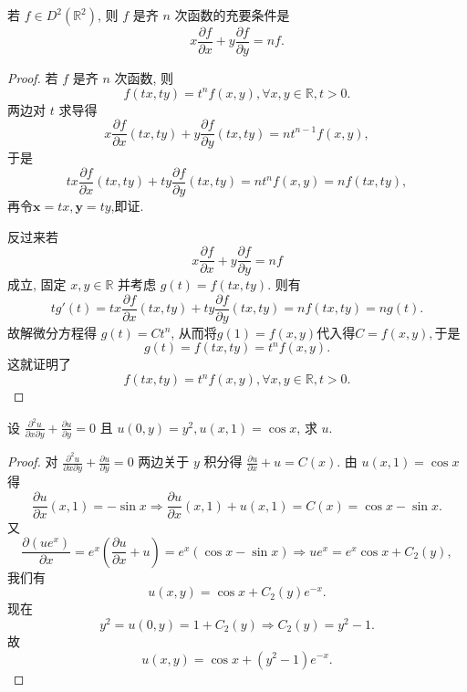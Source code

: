 \documentclass[../../main.tex]{subfiles}%
\begin{document}
\begin{proposition}[齐次函数基本性质]\label{proposition:齐次函数基本性质}
若 \( f \in D^2(\mathbb{R}^2) \), 则 \( f \) 是齐 \( n \) 次函数的充要条件是
\[
x \frac{\partial f}{\partial x} + y \frac{\partial f}{\partial y} = n f.
\]
\end{proposition}
\begin{proof}
若 \( f \) 是齐 \( n \) 次函数, 则
\[
f(tx, ty) = t^n f(x, y), \forall x, y \in \mathbb{R}, t > 0.
\]
两边对 \( t \) 求导得
\[
x \frac{\partial f}{\partial x}(tx, ty) + y \frac{\partial f}{\partial y}(tx, ty) = n t^{n - 1} f(x, y),
\]
于是
\[
tx \frac{\partial f}{\partial x}(tx, ty) + ty \frac{\partial f}{\partial y}(tx, ty) = n t^n f(x, y) = n f(tx, ty),
\]
再令$\mathbf{x}=tx,\mathbf{y}=ty$,即证.

反过来若
\[
x \frac{\partial f}{\partial x} + y \frac{\partial f}{\partial y} = n f
\]
成立, 固定 \( x, y \in \mathbb{R} \) 并考虑 \( g(t) = f(tx, ty) \). 则有
\[
t g'(t) = tx \frac{\partial f}{\partial x}(tx, ty) + ty \frac{\partial f}{\partial y}(tx, ty) = n f(tx, ty) = n g(t).
\]
故解微分方程得 \( g(t) = C t^n \), 从而将$g(1) = f(x, y)$代入得$C=f(x,y),$于是
\[
g(t)=f(tx, ty) = t^n f(x, y).
\]
这就证明了
\[
f(tx, ty) = t^n f(x, y), \forall x, y \in \mathbb{R}, t > 0.
\]
\end{proof}

\begin{example}
设 \( \frac{\partial^2 u}{\partial x \partial y} + \frac{\partial u}{\partial y} = 0 \) 且 \( u(0, y) = y^2, u(x, 1) = \cos x \), 求 \( u \).
\end{example}
\begin{proof}
对 \( \frac{\partial^2 u}{\partial x \partial y} + \frac{\partial u}{\partial y} = 0 \) 两边关于 \( y \) 积分得 \( \frac{\partial u}{\partial x} + u = C(x) \). 由 \( u(x, 1) = \cos x \) 得
\[
\frac{\partial u}{\partial x}(x,1)=-\sin x\Rightarrow \frac{\partial u}{\partial x}\left( x,1 \right) +u\left( x,1 \right) =C(x)=\cos x-\sin x.
\]
又
\[
\frac{\partial (u e^x)}{\partial x} = e^x \left( \frac{\partial u}{\partial x} + u \right) = e^x (\cos x - \sin x) \Rightarrow u e^x = e^x \cos x + C_2(y),
\]
我们有
\[
u(x, y) = \cos x + C_2(y) e^{-x}.
\]
现在
\[
y^2 = u(0, y) = 1 + C_2(y) \Rightarrow C_2(y) = y^2 - 1.
\]
故
\[
u(x, y) = \cos x + (y^2 - 1) e^{-x}.
\]
\end{proof}
\end{document}
